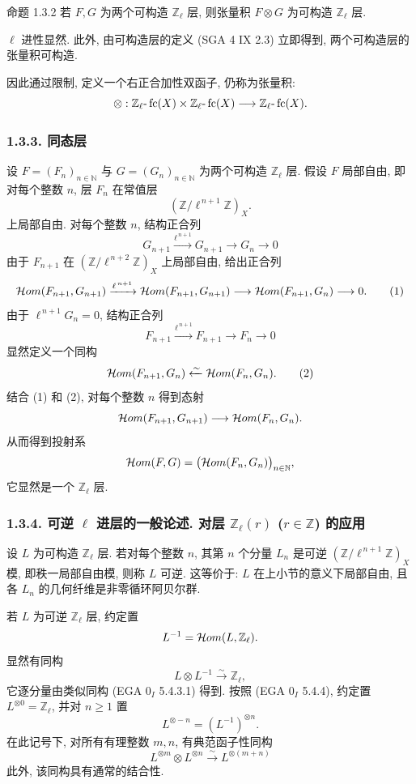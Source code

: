 \begin{statement}{命题 1.3.2}
若 \(F,G\) 为两个可构造 \(\mathbb Z_\ell\) 层, 则张量积 \(F\otimes G\) 为可构造 \(\mathbb Z_\ell\) 层.
\end{statement}

\begin{prooftext}[证明]
\(\ell\) 进性显然. 此外, 由可构造层的定义 (SGA 4 IX 2.3) 立即得到, 两个可构造层的张量积可构造.
\end{prooftext}

因此通过限制, 定义一个右正合加性双函子, 仍称为张量积:
\[
\otimes:\mathbb Z_\ell\text{-}\operatorname{fc}(X)\times \mathbb Z_\ell\text{-}\operatorname{fc}(X)
\longrightarrow \mathbb Z_\ell\text{-}\operatorname{fc}(X).
\]

\subsubsection*{1.3.3. 同态层}

设 \(F=(F_n)_{n\in\mathbb N}\) 与 \(G=(G_n)_{n\in\mathbb N}\) 为两个可构造 \(\mathbb Z_\ell\) 层. 假设 \(F\) 局部自由, 即对每个整数 \(n\), 层 \(F_n\) 在常值层
\[
(\mathbb Z/\ell^{\,n+1}\mathbb Z)_X.
\]
上局部自由. 对每个整数 \(n\), 结构正合列
\[
G_{n+1}\xrightarrow{\ell^{\,n+1}}G_{n+1}\longrightarrow G_n\longrightarrow 0
\]
由于 \(F_{n+1}\) 在 \((\mathbb Z/\ell^{\,n+2}\mathbb Z)_X\) 上局部自由, 给出正合列
\[
\mathcal{H}om(F_{n+1},G_{n+1})
 \xrightarrow{\ell^{\,n+1}}
\mathcal{H}om(F_{n+1},G_{n+1})
 \longrightarrow
\mathcal{H}om(F_{n+1},G_n)
 \longrightarrow 0.
\tag{1}
\]
由于 \(\ell^{\,n+1}G_n=0\), 结构正合列
\[
F_{n+1}\xrightarrow{\ell^{\,n+1}}F_{n+1}\longrightarrow F_n\longrightarrow 0
\]
显然定义一个同构
\[
\mathcal{H}om(F_{n+1},G_n)\xleftarrow{\sim}\mathcal{H}om(F_n,G_n).
\tag{2}
\]
结合 (1) 和 (2), 对每个整数 \(n\) 得到态射
\[
\mathcal{H}om(F_{n+1},G_{n+1})\longrightarrow \mathcal{H}om(F_n,G_n).
\]
从而得到投射系
\[
\mathcal{H}om(F,G)=\bigl(\mathcal{H}om(F_n,G_n)\bigr)_{n\in\mathbb N},
\]
它显然是一个 \(\mathbb Z_\ell\) 层.

\subsubsection*{1.3.4. 可逆 \(\ell\) 进层的一般论述. 对层 \(\mathbb Z_\ell(r)\) (\(r\in\mathbb Z\)) 的应用}

设 \(L\) 为可构造 \(\mathbb Z_\ell\) 层. 若对每个整数 \(n\), 其第 \(n\) 个分量 \(L_n\) 是可逆 \((\mathbb Z/\ell^{\,n+1}\mathbb Z)_X\) 模, 即秩一局部自由模, 则称 \(L\) 可逆. 这等价于: \(L\) 在上小节的意义下局部自由, 且各 \(L_n\) 的几何纤维是非零循环阿贝尔群.

若 \(L\) 为可逆 \(\mathbb Z_\ell\) 层, 约定置
\[
L^{-1}=\mathcal{H}om(L,\mathbb Z_\ell).
\]
显然有同构
\[
L\otimes L^{-1}\xrightarrow{\sim}\mathbb Z_\ell,
\]
它逐分量由类似同构 (EGA \(0_I\) 5.4.3.1) 得到. 按照 (EGA \(0_I\) 5.4.4), 约定置 \(L^{\otimes0}=\mathbb Z_\ell\), 并对 \(n\ge1\) 置
\[
L^{\otimes -n}=(L^{-1})^{\otimes n}.
\]
在此记号下, 对所有有理整数 \(m,n\), 有典范函子性同构
\[
L^{\otimes m}\otimes L^{\otimes n}\xrightarrow{\sim}L^{\otimes(m+n)}
\]
此外, 该同构具有通常的结合性.

